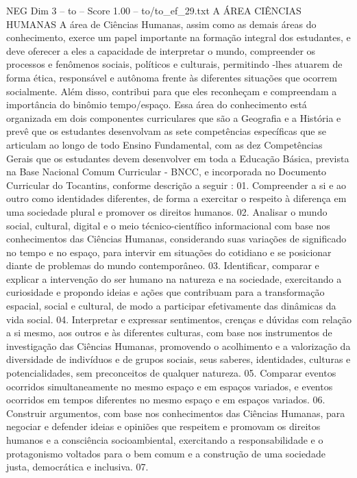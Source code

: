 \begin{textsample}{NEG Dim 3 – to – Score 1.00 – to/to\_ef\_29.txt}  \label{ex:f3_neg_190}
A ÁREA CIÊNCIAS HUMANAS A área de Ciências Humanas, assim como as demais áreas do conhecimento, exerce um papel importante na formação integral dos estudantes, e deve oferecer a eles a capacidade de interpretar o mundo, compreender os processos e fenômenos sociais, políticos e culturais, permitindo -lhes atuarem de forma ética, responsável e autônoma frente às diferentes situações que ocorrem socialmente.
Além disso, contribui para que eles reconheçam e compreendam a importância do binômio tempo/espaço.
Essa área do conhecimento está organizada em dois componentes curriculares que são a Geografia e a História e prevê que os estudantes desenvolvam as sete competências específicas que se articulam ao longo de todo Ensino Fundamental, com as dez Competências Gerais que os estudantes devem desenvolver em toda a Educação Básica, prevista na Base Nacional Comum Curricular - BNCC, e incorporada no Documento Curricular do Tocantins, conforme descrição a seguir : 01.
Compreender a si e ao outro como identidades diferentes, de forma a exercitar o respeito à diferença em uma sociedade plural e promover os direitos humanos. 02.
Analisar o mundo social, cultural, digital e o meio técnico-científico informacional com base nos conhecimentos das Ciências Humanas, considerando suas variações de significado no tempo e no espaço, para intervir em situações do cotidiano e se posicionar diante de problemas do mundo contemporâneo. 03.
Identificar, comparar e explicar a intervenção do ser humano na natureza e na sociedade, exercitando a curiosidade e propondo ideias e ações que contribuam para a transformação espacial, social e cultural, de modo a participar efetivamente das dinâmicas da vida social. 04.
Interpretar e expressar sentimentos, crenças e dúvidas com relação a si mesmo, aos outros e às diferentes culturas, com base nos instrumentos de investigação das Ciências Humanas, promovendo o acolhimento e a valorização da diversidade de indivíduos e de grupos sociais, seus saberes, identidades, culturas e potencialidades, sem preconceitos de qualquer natureza. 05.
Comparar eventos ocorridos simultaneamente no mesmo espaço e em espaços variados, e eventos ocorridos em tempos diferentes no mesmo espaço e em espaços variados. 06.
Construir argumentos, com base nos conhecimentos das Ciências Humanas, para negociar e defender ideias e opiniões que respeitem e promovam os direitos humanos e a consciência socioambiental, exercitando a responsabilidade e o protagonismo voltados para o bem comum e a construção de uma sociedade justa, democrática e inclusiva. 07.

\end{textsample}
